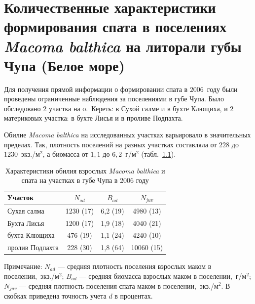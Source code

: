 	\chapter{Количественные характеристики формирования спата в поселениях {\it Macoma balthica}  на литорали губы Чупа (Белое море)}
Для получения прямой информации о формировании спата в $2006$~году были проведены ограниченные наблюдения за поселениями в губе Чупа.
Было обследовано 2 участка на о.~Кереть: в Сухой салме и в бухте Клющиха, и 2 материковых участка: в бухте Лисья и в проливе Подпахта.

Обилие {\it Macoma balthica} на исследованных участках варьировало в значительных пределах. 
Так, плотность поселений на разных участках составляла от $228$ до $1230$~экз./м$^2$, а биомасса от $1,1$ до $6,2$~г/м$^2$ (табл.~\ref{tab:NMacoma_recruitment}). 
\begin{table}[p]
\caption{Характеристики обилия взрослых {\it Macoma balthica} и спата на участках в губе Чупа в 2006 году}
\label{tab:NMacoma_recruitment}
\begin{center}
\begin{tabular}{|l|cc|c|}
\hline
Участок         & $N_{ad}$  & $B_{ad}$   & $N_{juv}$ \\ \hline
Сухая салма     & 1230 (17) & 6,2 (19) & 4980 (13)  \\  
Бухта Лисья     & 1200 (17) & 1,9 (18) & 4040 (21)  \\ 
бухта Клющиха   & 476 (19)  & 1,1 (24) & 4240 (10)  \\  
пролив Подпахта & 228 (30)  & 1,8 (64) & 10060 (15) \\ \hline
\end{tabular}
\end{center}

\footnotesize{Примечание: $N_{ad}$ --- средняя плотность поселения взрослых маком в поселении,~экз./м$^2$; 
$B_{ad}$ --- средняя биомасса взрослых маком в поселении,~г/м$^2$; 
$N_{juv}$ --- средняя плотность поселения спата маком в поселении,~экз./м$^2$. 
В скобках приведена точность учета $d$ в процентах.}
\end{table}


